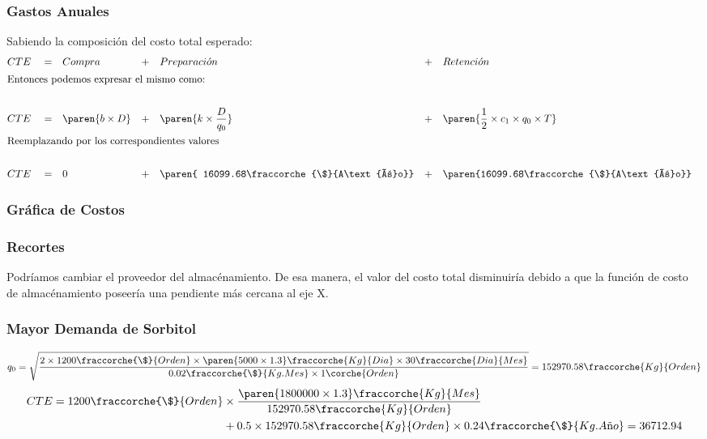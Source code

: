\begin{homeworkProblem}
\subsubsection{Gastos Anuales}
Sabiendo la composición del costo total esperado:
\begin{align*}
    &CTE& &=& &Compra& &+& &Preparaci\acute on& &+& &Retenci \acute on& \\
    \intertext{Entonces podemos expresar el mismo como:} \\
    &CTE& &=& &\paren{b\times D}& &+& &\paren{k\times \frac{D}{q_0}}& &+& &\paren{\frac{1}{2}\times c_1 \times q_0 \times T}& \\
    \intertext{Reemplazando por los correspondientes valores} \\
    &CTE& &=& &0&
     &+&
      &\paren{ 16099.68\fraccorche{\$}{A\text{ñ}o}}&  &+& 
      &\paren{16099.68\fraccorche{\$}{A\text{ñ}o}}&  \\
\end{align*}


\subsubsection{Gráfica de Costos}

\subsubsection{Recortes}
Podríamos cambiar el proveedor del almacénamiento. De esa manera, el valor del costo total disminuiría debido a que la función de costo de almacénamiento poseería una pendiente más cercana al eje X.

\subsubsection{Mayor Demanda de Sorbitol}
\begin{align*}
    q_0=\sqrt{
        \frac{
            2\times 1200\fraccorche{\$}{Orden}\times \paren{5000\times 1.3}\fraccorche{Kg}{Dia} \times 30\fraccorche{Dia}{Mes}
            }{
                0.02\fraccorche{\$}{Kg.Mes}\times 1\corche{Orden}
            }
        }
        =
        152970.58\fraccorche{Kg}{Orden}
\end{align*}
\begin{align*}
    CTE = 1200\fraccorche{\$}{Orden}&\times \frac{\paren{1800000\times 1.3}\fraccorche{Kg}{Mes}}{152970.58\fraccorche{Kg}{Orden}} \\ &+ 0.5\times 152970.58\fraccorche{Kg}{Orden}\times 0.24\fraccorche{\$}{Kg.A\text{ñ}o}=36712.94
\end{align*}


\end{homeworkProblem}
